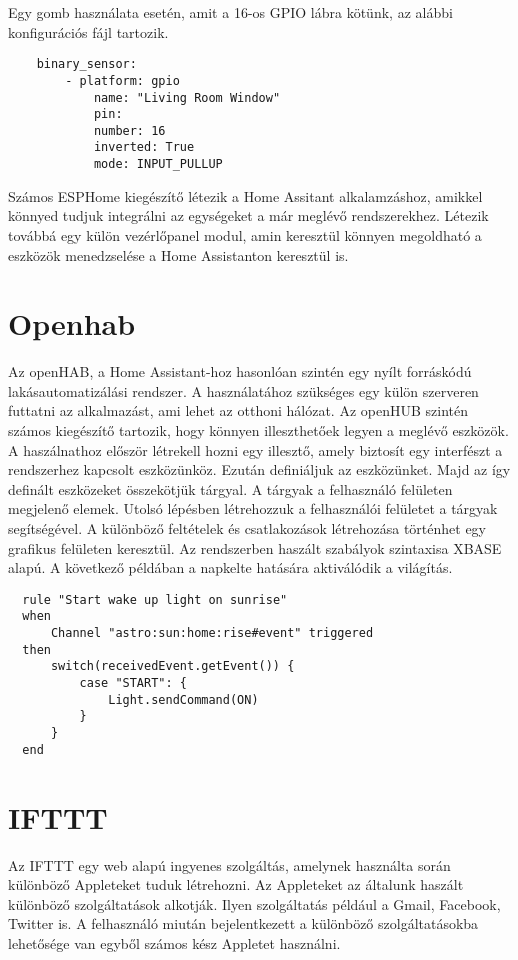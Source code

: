 Egy gomb használata esetén, amit a 16-os GPIO lábra kötünk, az alábbi konfigurációs fájl tartozik. \cite{esphome:online}

\begin{lstlisting}
    binary_sensor:
        - platform: gpio
            name: "Living Room Window"
            pin:
            number: 16
            inverted: True
            mode: INPUT_PULLUP
\end{lstlisting}

Számos ESPHome kiegészítő létezik a Home Assitant alkalamzáshoz, amikkel könnyed tudjuk integrálni az egységeket a már meglévő rendszerekhez. Létezik továbbá egy külön vezérlőpanel modul, amin keresztül könnyen megoldható a eszközök menedzselése a Home Assistanton keresztül is.




\section{Openhab}
Az openHAB, a Home Assistant-hoz hasonlóan szintén egy nyílt forráskódú lakásautomatizálási rendszer. A használatához szükséges egy külön szerveren futtatni az alkalmazást, ami lehet az otthoni hálózat. Az openHUB szintén számos kiegészítő tartozik, hogy könnyen illeszthetőek legyen a meglévő eszközök.
A haszálnathoz először létrekell hozni egy illesztő, amely biztosít egy interfészt a rendszerhez kapcsolt eszközünköz. Ezután definiáljuk az eszközünket. Majd az így definált eszközeket összekötjük tárgyal. A tárgyak a felhasználó felületen megjelenő elemek. Utolsó lépésben létrehozzuk a felhasználói felületet a tárgyak segítségével.
A különböző feltételek és csatlakozások létrehozása történhet egy grafikus felületen keresztül. Az rendszerben haszált szabályok szintaxisa XBASE alapú. A következő példában a napkelte hatására aktiválódik a világítás.
\begin{lstlisting}
  rule "Start wake up light on sunrise"
  when
      Channel "astro:sun:home:rise#event" triggered
  then
      switch(receivedEvent.getEvent()) {
          case "START": {
              Light.sendCommand(ON)
          }
      }
  end
\end{lstlisting}
\clearpage
\section{IFTTT}
Az IFTTT egy web alapú ingyenes szolgáltás, amelynek használta során különböző Appleteket tuduk létrehozni. Az Appleteket az általunk haszált különböző szolgáltatások alkotják. Ilyen szolgáltatás például a Gmail, Facebook, Twitter is. A felhasználó miután bejelentkezett a különböző szolgáltatásokba lehetősége van egyből számos kész Appletet használni.

